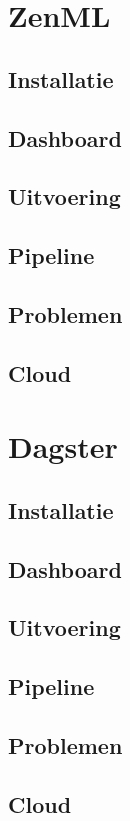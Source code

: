 \section{ZenML}
\subsection{Installatie}
\subsection{Dashboard}
\subsection{Uitvoering}
\subsection{Pipeline}
\subsection{Problemen}
\subsection{Cloud}

\section{Dagster}
\subsection{Installatie}
\subsection{Dashboard}
\subsection{Uitvoering}
\subsection{Pipeline}
\subsection{Problemen}
\subsection{Cloud}


